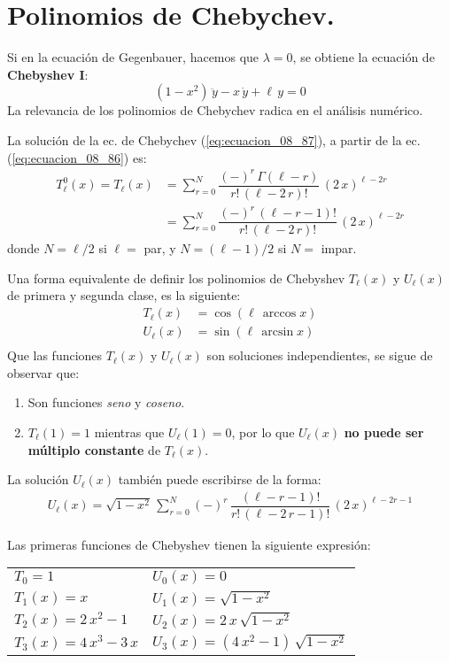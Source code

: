  \section{Polinomios de Chebychev.}
 Si en la ecuación de Gegenbauer, hacemos que $\lambda = 0$, se obtiene la ecuación de \textbf{Chebyshev I}:
\begin{equation}
(1 - x^{2}) \, \ddot{y} - x \, \dot{y} + \ell \, y = 0
\label{eq:ecuacion_08_87}
\end{equation}
La relevancia de los polinomios de Chebychev radica en el análisis numérico.
\par
La solución de la ec. de Chebychev (\ref{eq:ecuacion_08_87}), a partir de la ec. (\ref{eq:ecuacion_08_86}) es:
\begin{align*}
T_{\ell}^{0} (x) = T_{\ell} (x) &= \sum_{r=0}^{N} \dfrac{(-)^{r} \, \Gamma (\ell - r)}{r! \, (\ell - 2 \, r)!} \, (2 \, x)^{\ell - 2r} \\
&= \sum_{r=0}^{N} \dfrac{(-)^{r} \, (\ell - r - 1)!}{r! \, (\ell - 2 \, r)!} \, (2 \, x)^{\ell - 2r}
\end{align*}
donde $N=\ell/2$ si $\ell=$ par, y $N=(\ell-1)/2$ si $N=$ impar.
\par
Una forma equivalente de definir los polinomios de Chebyshev $T_{\ell} (x)$ y $U_{\ell} (x)$ de primera y segunda clase, es la siguiente:
\begin{align*}
T_{\ell} (x) &= \cos (\ell \, \arccos x) \\
U_{\ell} (x) &= \sin (\ell \, \arcsin x) \\
\end{align*}
Que las funciones $T_{\ell} (x)$ y $U_{\ell} (x)$ son soluciones independientes, se sigue de observar que:
\begin{enumerate}[label=\alph*)]
\item Son funciones \emph{seno} y \emph{coseno}.
\item $T_{\ell}(1) = 1$ mientras que $U_{\ell}(1) = 0$, por lo que $U_{\ell}(x)$ \textbf{no puede ser múltiplo constante} de $T_{\ell}(x)$.
\end{enumerate}
La solución $U_{\ell}(x)$ también puede escribirse de la forma:
\begin{align*}
U_{\ell} (x) = \sqrt{1 - x^{2}} \, \sum_{r=0}^{N} (-)^{r} \, \dfrac{(\ell - r - 1)!}{r! \, (\ell -2 \, r - 1)!} \, (2 \, x)^{\ell-2r-1}
\end{align*}
\par
Las primeras funciones de Chebyshev tienen la siguiente expresión:
\begin{table}[H]
\centering
\begin{tabular}{>{\raggedright\arraybackslash}p{5cm} >{\raggedright\arraybackslash}p{5cm}}
$T_{0}=1$ & $U_{0}(x)=0$  \\
$T_{1}(x) = x$ & $U_{1}(x) = \sqrt{1 - x^{2}}$ \\
$T_{2}(x) = 2 \, x^{2} - 1$ & $U_{2}(x) = 2 \, x \, \sqrt{1 - x^{2}}$ \\
$T_{3}(x) = 4 \, x^{3} - 3 \, x$ & $U_{3}(x) = (4 \, x^{2} - 1) \, \sqrt{1 - x^{2}}$ \\ 
\end{tabular}
\end{table}
